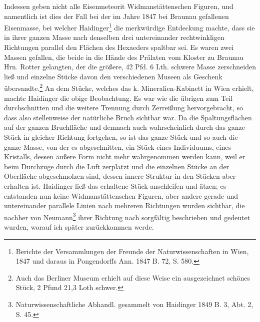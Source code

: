 \documentclass[a4paper, 11pt, oneside]{article}
\begin{document}
Indessen geben nicht alle Eisenmeteorit Widmanstättenschen Figuren, und namentlich ist dies der Fall bei der im Jahre 1847 bei Braunau gefallenen Eisenmasse, bei welcher Haidinger\footnote{Berichte der Versammlungen der Freunde der Naturwissenschaften in Wien, 1847 und daraus in Pongendorffs Ann. 1847 B. 72, S. 580.} die merkwürdige Entdeckung machte, dass sie in ihrer ganzen Masse nach denselben drei untereinander rechtwinkligen Richtungen parallel den Flächen des Hexaeders spaltbar sei. Es waren zwei Massen gefallen, die beide in die Hände des Prälaten vom Kloster zu Braunau Hrn. Rotter gelangten, der die größere, 42 Pfd. 6 Lth. schwere Masse zerschneiden ließ und einzelne Stücke davon den verschiedenen Museen als Geschenk übersandte.\footnote{Auch das Berliner Museum erhielt auf diese Weise ein ausgezeichnet schönes Stück, 2 Pfund 21,3 Loth schwer.} An dem Stücke, welches das k. Mineralien-Kabinett in Wien erhielt, machte Haidinger die obige Beobachtung. Es war wie die übrigen zum Teil durchschnitten und die weitere Trennung durch Zerreißung hervorgebracht, so dass also stellenweise der natürliche Bruch sichtbar war. Da die Spaltungsflächen auf der ganzen Bruchfläche und demnach auch wahrscheinlich durch das ganze Stück in gleicher Richtung fortgehen, so ist das ganze Stück und so auch die ganze Masse, von der es abgeschnitten, ein Stück eines Individuums, eines Kristalls, dessen äußere Form nicht mehr wahrgenommen werden kann, weil er beim Durchzuge durch die Luft zerplatzt und die einzelnen Stücke an der Oberfläche abgeschmolzen sind, dessen innere Struktur in den Stücken aber erhalten ist. Haidinger ließ das erhaltene Stück anschleifen und ätzen; es entstanden nun keine Widmanstättenschen Figuren, aber andere gerade und untereinander parallele Linien nach mehreren Richtungen wurden sichtbar, die nachher von Neumann\footnote{Naturwissenschaftliche Abhandl. gesammelt von Haidinger 1849 B. 3, Abt. 2, S. 45.} ihrer Richtung nach sorgfältig beschrieben und gedeutet wurden, worauf ich später zurückkommen werde.
\end{document}
